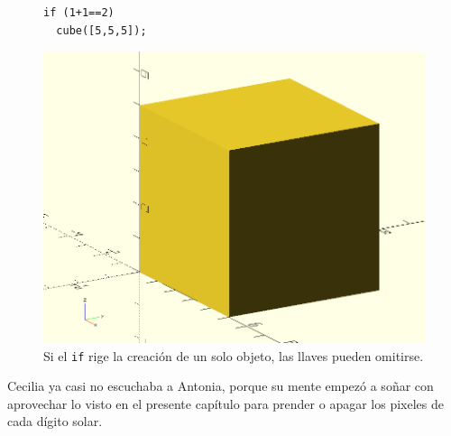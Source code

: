 \begin{figure}[ht]
\begin{minipage}[]{.5\textwidth}%
\begin{lstlisting}
if (1+1==2)
  cube([5,5,5]);
\end{lstlisting}
\end{minipage}
\begin{minipage}[]{.49\textwidth}%
  \centering
  \includegraphics[width=.75\textwidth]{imagenes/if-4}
\end{minipage}
\caption{Si el \lstinline!if! rige la creación de un solo objeto,
  las llaves pueden omitirse.}
\label{fig:if-sin-llaves}
\end{figure}


Cecilia ya casi no escuchaba a Antonia, porque su mente empezó a soñar
con aprovechar lo visto en el presente capítulo para prender o apagar
los pixeles de cada dígito solar.

